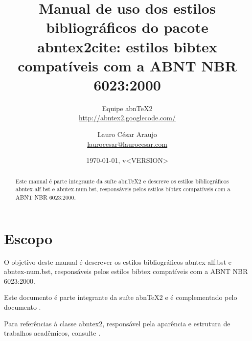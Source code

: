 \documentclass[a4paper]{ltxdoc}
\begin{document}
\nocite{ABNT-final}

\newcommand{\titulo}{Manual de uso dos estilos bibliográficos do pacote
\textsf{abntex2cite}: estilos \textsf{bibtex} compatíveis com a ABNT NBR
6023:2000}
\newcommand{\abnTeX}{abn\TeX}
\newcommand{\abnTeXSite}{\url{http://abntex2.googlecode.com/}}

\title{\titulo}
\author{Equipe \abnTeX2\\\abnTeXSite 
\and 
Lauro César Araujo\\\url{laurocesar@laurocesar.com}}
\date{\today, v<VERSION>}


% 

\maketitle

\begin{abstract}
Este manual é parte integrante da suíte \abnTeX2 e descreve os estilos
bibliográficos \textsf{abntex-alf.bst} e \textsf{abntex-num.bst}, responsáveis
pelos estilos \textsf{bibtex} compatíveis com a ABNT NBR 6023:2000.
\end{abstract}


\tableofcontents
\listoftables

\section{Escopo}

O objetivo deste manual é descrever os estilos bibliográficos
\textsf{abntex-alf.bst} e \textsf{abntex-num.bst}, responsáveis pelos estilos
\textsf{bibtex} compatíveis com a ABNT NBR 6023:2000. 

Este documento é parte integrante da suíte \abnTeX2 e é complementado pelo
documento .

Para referências à classe \textsf{abntex2}, responsável pela aparência e
estrutura de trabalhos acadêmicos, consulte .
\end{document}
